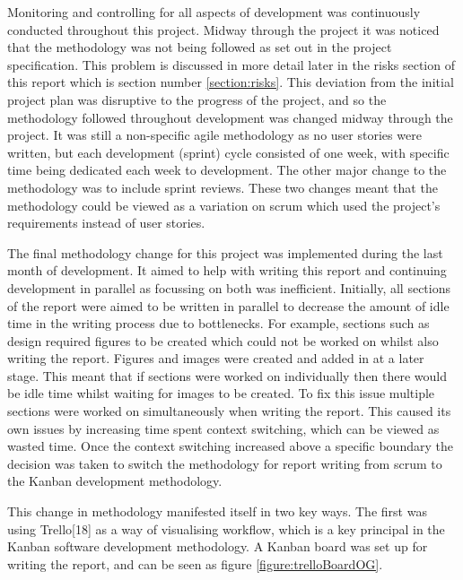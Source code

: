 \documentclass{article}
\begin{document}
Monitoring and controlling for all aspects of development was continuously conducted throughout this project. Midway through the project it was noticed that the methodology was not being followed as set out in the project specification. This problem is discussed in more detail later in the risks section of this report which is section number \ref{section:risks}. This deviation from the initial project plan was disruptive to the progress of the project, and so the methodology followed throughout development was changed midway through the project. It was still a non-specific agile methodology as no user stories were written, but each development (sprint) cycle consisted of one week, with specific time being dedicated each week to development. The other major change to the methodology was to include sprint reviews. These two changes meant that the methodology could be viewed as a variation on scrum which used the project's requirements instead of user stories. \par

The final methodology change for this project was implemented during the last month of development. It aimed to help with writing this report and continuing development in parallel as focussing on both was inefficient. Initially, all sections of the report were aimed to be written in parallel to decrease the amount of idle time in the writing process due to bottlenecks. For example, sections such as design required figures to be created which could not be worked on whilst also writing the report. Figures and images were created and added in at a later stage. This meant that if sections were worked on individually then there would be idle time whilst waiting for images to be created. To fix this issue multiple sections were worked on simultaneously when writing the report. This caused its own issues by increasing time spent context switching, which can be viewed as wasted time. Once the context switching increased above a specific boundary the decision was taken to switch the methodology for report writing from scrum to the Kanban development methodology. \par

This change in methodology manifested itself in two key ways. The first was using Trello[18] as a way of visualising workflow, which is a key principal in the Kanban software development methodology. A Kanban board was set up for writing the report, and can be seen as figure \ref{figure:trelloBoardOG}. 
\end{document}
